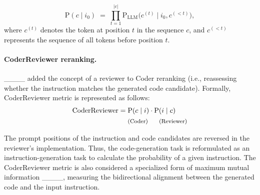 \[
\text{P}(c \mid i_0) \;=\; \prod_{t=1}^{|c|} \text{P}_{\text{LLM}}\bigl(c^{(t)} \mid i_0, c^{(<t)}\bigr),
\]
where $c^{(t)}$ denotes the token at position $t$ in the sequence $c$, and $c^{(<t)}$ represents the sequence of all tokens before position $t$.

\paragraph{CoderReviewer reranking.} ____ added the concept of a reviewer to Coder reranking (i.e.,  reassessing whether the instruction matches the generated code candidate). Formally, CoderReviewer metric is represented as follows: 
\[
\begin{aligned}
\text{CoderReviewer} &=  \text{P}(c \mid i) \cdot \text{P}(i \mid c) \\
&\quad \text{ \footnotesize (Coder) \hspace{1.2em} (Reviewer)}
\end{aligned}
\]

The prompt positions of the instruction and code candidates are reversed in the reviewer's implementation. Thus, the code-generation task is reformulated as an instruction-generation task to calculate the probability of a given instruction. The CoderReviewer metric is also considered a specialized form of maximum mutual information ____, measuring the bidirectional alignment between the generated code and the input instruction.

